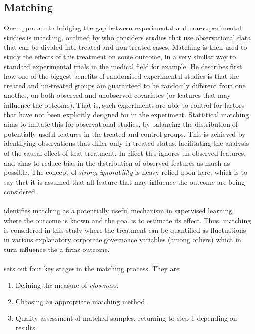 \subsection{Matching}
{One approach to bridging the gap between experimental and non-experimental studies is matching, outlined by \cite{stuart2010matching} who considers studies that use observational data that can be divided into treated and non-treated cases. Matching is then used to study the effects of this treatment on some outcome, in a very similar way to standard experimental trials in the medical field for example. He describes first how one of the biggest benefits of randomised experimental studies is that the treated and un-treated groups are guaranteed to be randomly different from one another, on both observed and unobserved covariates (or features that may influence the outcome). That is, such experiments are able to control for factors that have not been explicitly designed for in the experiment. Statistical matching aims to imitate this for observational studies, by balancing the distribution of potentially useful features in the treated and control groups. This is achieved by identifying observations that differ only in treated status, facilitating the analysis of the causal effect of that treatment. In effect this ignores un-observed features, and aims to reduce bias in the distribution of observed features as much as possible. The concept of {\it strong ignorability} is heavy relied upon here, which is to say that it is assumed that all feature that may influence the outcome are being considered. \\\\
\cite {stuart2010matching} identifies matching as a potentially useful mechanism in supervised learning, where the outcome is known and the goal is to estimate its effect. Thus, matching is considered in this study where the treatment can be quantified as fluctuations in various explanatory corporate governance variables (among others) which in turn influence the a firms outcome. \\\\
\cite {stuart2010matching} sets out four key stages in the matching process. They are;
\begin {enumerate}
\item{Defining the measure of {\it closeness}.}
\item{Choosing an appropriate matching method.}
\item{Quality assessment of matched samples, returning to step 1 depending on results.}

\end{enumerate}}
